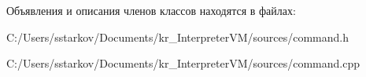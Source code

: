 Объявления и описания членов классов находятся в файлах\+:\begin{DoxyCompactItemize}
\item 
C\+:/\+Users/sstarkov/\+Documents/kr\+\_\+\+Interpreter\+V\+M/sources/command.\+h\item 
C\+:/\+Users/sstarkov/\+Documents/kr\+\_\+\+Interpreter\+V\+M/sources/command.\+cpp\end{DoxyCompactItemize}
